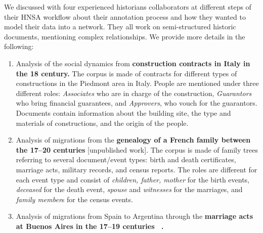 We discussed with four experienced historians collaborators at different steps of their HNSA workflow about their annotation process and how they wanted to model their data into a network.
They all work on semi-structured historic documents, mentioning complex relationships.
We provide more details in the following:


\begin{enumerate}[nosep,leftmargin=*]
    \item Analysis of the social dynamics from \textbf{construction contracts in Italy in the 18 century\cite{Cristofoli2018, Rolla2018}.}
    The corpus is made of contracts for different types of constructions in the Piedmont area in Italy. People are mentioned under three different roles: \textit{Associates} who are in charge of the construction, \textit{Guarantors} who bring financial guarantees, and \textit{Approvers}, who vouch for the guarantors. Documents contain information about the building site, the type and materials of constructions, and the origin of the people.
    \item Analysis of migrations from the \textbf{genealogy of a French family between the 17--20 centuries} [unpublished work].
    The corpus is made of family trees referring to several document/event types: birth and death certificates, marriage acts, military records, and census reports.
    The roles are different for each event type and consist of \textit{children, father, mother} for the birth events, \textit{deceased} for the death event, \textit{spouse} and \textit{witnesses} for the marriages, and \textit{family member}s for the census events.
    \item Analysis of migrations from Spain to Argentina through the \textbf{marriage acts at Buenos Aires in the 17--19 centuries ~\cite{moutoukiasBuenosAiresPort2016, rueda1989matrimonios}.}

\end{enumerate}
